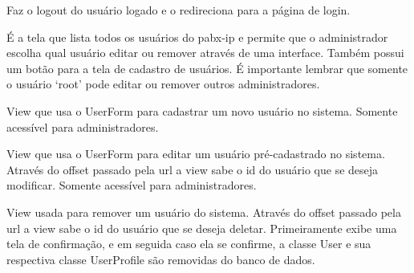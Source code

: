 \documentclass[letterpaper,10pt,brazil]{sphinxmanual}
\begin{document}

\begin{fulllineitems}
\label{apps/accounts:accounts.views.logout}
Faz o logout do usuário logado e o redireciona para a página de login.

\end{fulllineitems}


\begin{fulllineitems}
\label{apps/accounts:accounts.views.settings}
É a tela que lista todos os usuários do pabx-ip e permite que o administrador escolha qual usuário editar ou remover através de uma interface. Também possui um botão para a tela de cadastro de usuários. É importante lembrar que somente o usuário `root' pode editar ou remover outros administradores.

\end{fulllineitems}


\begin{fulllineitems}
\label{apps/accounts:accounts.views.create}
View que usa o UserForm para cadastrar um novo usuário no sistema. Somente acessível para administradores.

\end{fulllineitems}


\begin{fulllineitems}
\label{apps/accounts:accounts.views.edit}
View que usa o UserForm para editar um usuário pré-cadastrado no sistema. Através do offset passado pela url a view sabe o id do usuário que se deseja modificar. Somente acessível para administradores.

\end{fulllineitems}


\begin{fulllineitems}
\label{apps/accounts:accounts.views.delete}
View usada para remover um usuário do sistema. Através do offset passado pela url a view sabe o id do usuário que se deseja deletar. Primeiramente exibe uma tela de confirmação, e em seguida caso ela se confirme, a classe User e sua respectiva classe UserProfile são removidas do banco de dados.

\end{fulllineitems}
\end{document}
